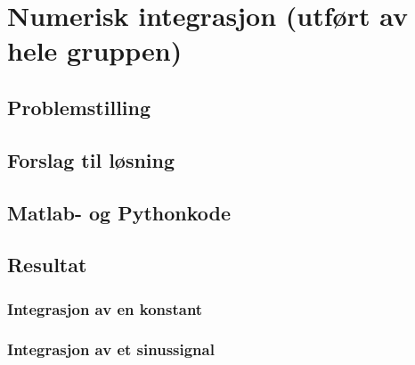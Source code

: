 \documentclass[main.tex]{subfiles}
\begin{document}
\chapter{Numerisk integrasjon (utført av hele gruppen) }\label{kap:integrasjon}

\section{Problemstilling}

\section{Forslag til løsning}

\section{Matlab- og Pythonkode}

\section{Resultat}

\subsection{Integrasjon av en konstant}

\subsection{Integrasjon av et sinussignal}
\end{document}
